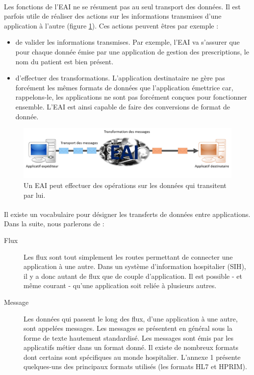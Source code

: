 			\paragraph{}%
			Les fonctions de l'EAI ne se résument pas au seul transport des données. Il
			est parfois utile de réaliser des actions sur les informations transmises
			d'une application à l'autre (figure \ref{interop_transfo}). Ces actions
			peuvent êtres par exemple :\newline
			\begin{itemize}
			  \item de valider les informations transmises. Par exemple, l'EAI va
			  s'assurer que pour chaque donnée émise par une application de gestion des
			  prescriptions, le nom du patient est bien présent.
			  \item d'effectuer des transformations. L'application destinataire ne
			  gère pas forcément les mêmes formats de données que l'application émettrice
			  car, rappelons-le, les applications ne sont pas forcément conçues pour
			  fonctionner ensemble. L'EAI est ainsi capable de faire des conversions de
			  format de donnée.\newline
			\end{itemize}
			\begin{figure}[H]
				\centering
				\includegraphics[width=15cm]{../img/eai_2.png}
				\caption{\label{interop_transfo} Un EAI peut effectuer des opérations sur
				les données qui transitent par lui.}
			\end{figure}
			
			\paragraph{}%
 			Il existe un vocabulaire pour désigner les transferts de données entre
 			applications. Dans la suite, nous parlerons de :
 			\begin{description}
 				\item[Flux] Les flux sont tout simplement les routes permettant de
 				connecter une application à une autre. Dans un système d'information hospitalier
 				(SIH), il y a donc autant de flux que de couple d'application. Il est
 				possible - et même courant - qu'une application soit reliée à plusieurs
 				autres.
 				\item[Message] Les données qui passent le long des flux, d'une application
 				à une autre, sont appelées messages. Les messages se présentent en général
 				sous la forme de texte hautement standardisé. Les messages sont émis par les
 				applicatifs métier dans un format donné. Il existe de nombreux formats
 				dont certains sont spécifiques au monde hospitalier. L'annexe 1 présente
 				quelques-uns des principaux formats utilisés (les formats HL7 et HPRIM).
 			\end{description}

